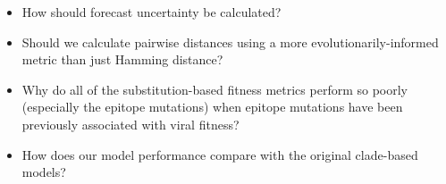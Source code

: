 \begin{itemize}
\item{How should forecast uncertainty be calculated?}
\item{Should we calculate pairwise distances using a more evolutionarily-informed metric than just Hamming distance?}
\item{Why do all of the substitution-based fitness metrics perform so poorly (especially the epitope mutations) when epitope mutations have been previously associated with viral fitness?}
\item{How does our model performance compare with the original clade-based models?}
\end{itemize}
